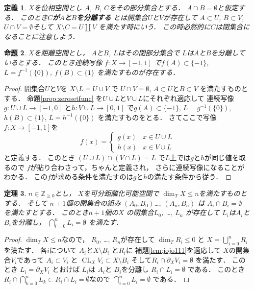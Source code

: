 \documentclass[leqno, a4paper, 12pt]{jsarticle}
\newtheorem{thm}{定理}
\newtheorem{prop}[thm]{命題}
\newtheorem{df}[thm]{定義}
\newcommand{\zz}{\mathbb{Z}}
\DeclareMathOperator{\cl}{CL}
\numberwithin{equation}{section}
\begin{document}
\begin{df}
$X$を位相空間とし
$A$, $B$, $C$をその部分集合とする．
$A\cap B=\emptyset$と仮定する．
このとき\textbf{$C$が$A$と$B$を分離する}
とは開集合$U$と$V$が存在して
$A\subset U$, $B\subset V$, 
$U\cap V=\emptyset$そして
$X\setminus C=U\coprod V$
を満たす時にいう．
この時必然的に$C$は閉集合になることに注意しよう．
\end{df}

\begin{prop}\label{prop:zeroset2f}
$X$を距離空間とし，
$A$と$B$, $L$はその閉部分集合で
$L$は$A$と$B$を分離しているとする．
このとき連続写像
$f\colon X\to [-1, 1]$
で$f(A)\subset\{-1\}$, 
$L=f^{-1}(\{0\})$, 
$f(B)\subset \{1\}$
を満たすものが存在する．
\end{prop}
\begin{proof}
開集合$U$と$V$を
$X\setminus L=U\cup V$
で
$U\cap V=\emptyset$, 
$A\subset U$と$B\subset V$
を満たすものとする．
命題\ref{prop:zerosetfunc}
を$U\cup L$と$V\cup L$にそれぞれ適応して
連続写像
$g\colon U\cup L\to [-1, 0]$
と$h\colon V\cup L\to [0, 1]$
で$g(A)\subset \{-1\}$, 
$L=g^{-1}(\{0\})$, 
$h(B)\subset \{1\}$, 
$L=h^{-1}(\{0\})$
を満たすものをとる．
さてここで写像$f\colon X\to [-1, 1]$を
\[
f(x)=
\begin{cases}
g(x) & \text{$x\in U\cup L$}\\
h(x) & \text{$x\in V\cup L$}
\end{cases}
\]
と定義する．
このとき
$(U\cup L)\cap (V\cap L)=L$
で$L$上では$g$と$h$が同じ値を取るので
$f$が貼り合わさって，ちゃんと定義され，
さらに連続写像になることがわかる．
この$f$が求める条件を満たすのは$g$と$h$の満たす条件から従う．
\end{proof}




\begin{thm}\label{thm:n+1capset}
$n\in \zz_{\ge 0}$とし，
$X$を可分距離化可能空間で
$\dim_{T}X\le n$を満たすものとする．
そして
$n+1$個の閉集合の組み
$(A_{0}, B_{0})$\dots, 
$(A_{n}, B_{n})$
は
$A_{i}\cap B_{i}=\emptyset$
を満たすとする．
このとき$n+1$個の$X$
の閉集合$L_{0}$, \dots, $L_{n}$
が存在して
$L_{i}$は$A_{i}$と$B_{i}$を分離し，
$\bigcap_{i=0}^{n}L_{i}=\emptyset$
を満たす．
\end{thm}
\begin{proof}
$\dim_{T}X\le n$なので，
$R_{0}$, \dots, $R_{n}$が存在して
$\dim_{T}R_{i}\le 0$
と
$X=\bigcup_{i=0}^{n}R_{i}$
を満たす．
各$i$について
$A_{i}$と$X\setminus B_{i}$
と$R_{i}$に
補題\ref{lem:jojo111}を適応して
$X$の開集合$V_{i}$であって
$A_{i}\subset V_{i}$
と
$\cl_{X}V_{i}\subset X\setminus B_{i}$
そして$R_{i}\cap \partial_{X}V_{i}=\emptyset$
を満たす．
このとき
$L_{i}=\partial_{X}V_{i}$
とおけば
$L_{i}$は
$A_{i}$と
$B_{i}$を分離し
$R_{i}\cap L_{i}=\emptyset$
である．
このとき
$R_{i}\cap \bigcap_{k=0}^{n}L_{k}\subset R_{i}\cap L_{i}=\emptyset$なので
$\bigcap_{i=0}^{n}L_{i}=\emptyset$
である．
\end{proof}
\end{document}

